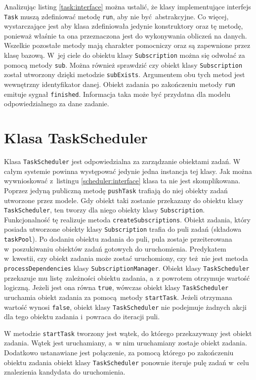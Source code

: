 Analizując listing \ref{task:interface} można ustalić, że klasy implementujące interfejs \lstinline$Task$ muszą zdefiniować metodę \lstinline$run$, aby nie być abstrakcyjne. Co więcej, wystarczające jest aby klasa zdefiniowała jedynie konstruktory oraz tę metodę, ponieważ właśnie ta ona przeznaczona jest do wykonywania obliczeń na danych. Wszelkie pozostałe metody mają charakter pomocniczy oraz są zapewnione przez klasę bazową. W~jej ciele do obiektu klasy \lstinline$Subscription$ można się odwołać za pomocą metody \lstinline$sub$. Można również sprawdzić czy obiekt klasy \lstinline$Subscription$ został utworzony dzięki metodzie \lstinline$subExists$. Argumentem obu tych metod jest wewnętrzny identyfikator danej. Obiekt zadania po zakończeniu metody \lstinline$run$ emituje sygnał \lstinline$finished$. Informacja taka może być przydatna dla modelu odpowiedzialnego za dane zadanie.

\section{Klasa TaskScheduler} 
Klasa \lstinline$TaskScheduler$ jest odpowiedzialna za zarządzanie obiektami zadań. W całym systemie powinna występować jedynie jedna instancja tej klasy. Jak można wywnioskować z~listingu \ref{scheduler:interface} klasa ta nie jest skomplikowana. Poprzez jedyną publiczną metodę \lstinline$pushTask$ trafiają do niej obiekty zadań utworzone przez modele. Gdy obiekt taki zostanie przekazany do obiektu klasy \lstinline$TaskScheduler$, ten tworzy dla niego obiekty klasy \lstinline$Subscription$. Funkcjonalność tę realizuje metoda \lstinline$createSubscriptions$. Obiekt zadania, który posiada utworzone obiekty klasy \lstinline$Subscription$ trafia do puli zadań (składowa \lstinline$taskPool$). Po dodaniu obiektu zadania do puli, pula zostaje przeiterowana w~poszukiwaniu obiektów zadań gotowych do uruchomienia. Predykatem w~kwestii, czy obiekt zadania może zostać uruchomiony, czy też nie jest metoda \lstinline$processDependencies$ klasy \lstinline$SubscriptionManager$. Obiekt klasy \lstinline$TaskScheduler$ przekazuje mu listę zależności obiektu zadania, a~z powrotem otrzymuje wartość logiczną. Jeżeli jest ona równa \lstinline$true$, wówczas obiekt klasy \lstinline$TaskScheduler$ uruchamia obiekt zadania za pomocą metody \lstinline$startTask$. Jeżeli otrzymana wartość wynosi \lstinline$false$, obiekt klasy \lstinline$TaskScheduler$ nie podejmuje żadnych akcji dla tego obiektu zadania i~powraca do iteracji puli.

W metodzie \lstinline$startTask$ tworzony jest wątek, do którego przekazywany jest obiekt zadania. Wątek jest uruchamiany, a~w nim uruchamiany zostaje obiekt zadania. Dodatkowo ustanawiane jest połączenie, za pomocą którego po zakończeniu obiektu zadania obiekt klasy \lstinline$TaskScheduler$ ponownie iteruje pulę zadań w~celu znalezienia kandydata do uruchomienia. 

